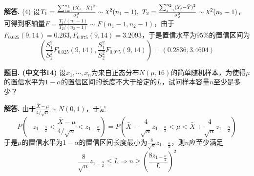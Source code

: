 \documentclass[12pt, a4paper, oneside]{ctexart}
\newcounter{problem}  %
\newenvironment{problem}[1][]{\stepcounter{problem}\par\noindent\textbf{题目\arabic{problem}. #1}}{\smallskip\par}
\newenvironment{solution}[1][]{\par\noindent\textbf{#1解答. }}{\smallskip\par}  %
\let\leq=\leqslant %
\let\geq=\geqslant %
\DeclareRobustCommand{\rchi}{{\mathpalette\irchi\relax}}
\newcommand{\irchi}[2]{\raisebox{\depth}{$#1\chi$}} %
\begin{document}
\begin{solution}
    (4) 设$T_1 = \frac{\sum_{i=1}^{n_1}(X_i-\bar{X})^2}{\sigma_1^2}\sim\rchi^2(n_1-1),\ T_2 = \frac{\sum_{j=1}^{n_2}(Y_j-\bar{Y})^2}{\sigma_2^2}\sim\rchi^2(n_2-1)$，可得到枢轴量$F = \frac{T_1/(n_1-1)}{T_2/(n_2-1)}\sim F(n_1-1,n_2-1)$，由于$F_{0.025}(9,14) = 0.263, F_{0.975}(9,14) = 3.2093$，于是置信水平为$95\%$的置信区间为
    \begin{equation*}
        \left(\frac{S_1^2}{S_2^2}F_{0.025}(9,14),\frac{S_1^2}{S_2^2}F_{0.975}(9,14)\right) = (0.2836, 3.4604)
    \end{equation*}
\end{solution}
\begin{problem}[(中文书14)]
    设$x_1,\cdots,x_n$为来自正态分布$N(\mu,16)$的简单随机样本，为使得$\mu$的置信水平为$1-\alpha$的置信区间的长度不大于给定的$L$，试问样本容量$n$至少是多少？
\end{problem}
\begin{solution}
    由于$\frac{\bar{X}-\mu}{4/\sqrt{n}}\sim N(0,1)$，于是
    \begin{equation*}
        P(-z_{1-\frac{\alpha}{2}} < \frac{\bar{X}-\mu}{4/\sqrt{n}} < z_{1-\frac{\alpha}{2}}) = P(\bar{X}-\frac{4}{\sqrt{n}}z_{1-\frac{\alpha}{2}} < \mu < \bar{X}+\frac{4}{\sqrt{n}}z_{1-\frac{\alpha}{2}})
    \end{equation*}
    于是$\mu$的置信水平为$1-\alpha$的置信区间长度最小为$\frac{8}{\sqrt{n}}z_{1-\frac{\alpha}{2}}$，则$n$应至少满足
    \begin{equation*}
        \frac{8}{\sqrt{n}}z_{1-\frac{\alpha}{2}} \leq L\Rightarrow n\geq \left(\frac{8z_{1-\frac{\alpha}{2}}}{L}\right)^2
    \end{equation*}
\end{solution}

\iffalse
\centerline{
    \texttt{[image: figure.png]}
}
\renewcommand\arraystretch{0.8} %
\begin{table}[!htbp] %
    \centering %
    \begin{tabular}{p{1cm}<{\centering}p{1cm}<{\centering}p{3cm}<{\centering}p{5cm}<{\centering}} %
        \toprule
        $x_i$ & $f[x_1]$ & $f[x_i,x_{i+1}]$ & $f[x_i,x_{i+1},x_{i+2}]$ \\
        \midrule
        $x_0$ & $f(x_0)$ &                  &                          \\
        $x_0$ & $f(x_0)$ & $f'(x_0)$        &                          \\
        $x_0$ & $f(x_1)$ & $\frac{f(x_1)-f(x_0)}{x_1-x_0}$ & $\frac{f(x_1)-f(x_0)}{(x_1-x_0)^2}-\frac{f'(x_0)}{x_1-x_0}$\\
        \bottomrule
    \end{tabular}
\end{table}

\def\Log{\text{Log}} %
$\Log$ %
\fi
\end{document}
